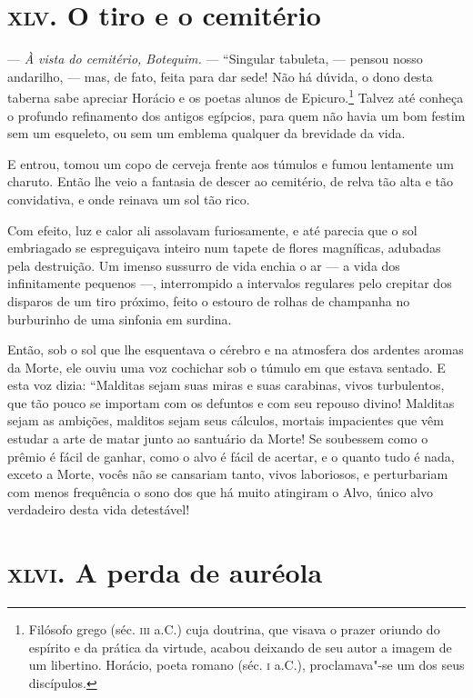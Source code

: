 \chapter{\textsc{xlv.} O tiro e o cemitério}

--- \textit{À vista do cemitério, Botequim.} --- “Singular tabuleta, ---
pensou nosso andarilho, --- mas, de fato, feita para dar sede! Não há dúvida, o dono desta taberna sabe apreciar Horácio e os poetas alunos
de Epicuro.\footnote{  Filósofo grego (séc. \textsc{iii} a.C.) cuja doutrina, que
visava o prazer oriundo do espírito e da prática da virtude, acabou
deixando de seu autor a imagem de um libertino. Horácio, poeta romano
(séc. \textsc{i} a.C.), proclamava"-se um dos seus discípulos.} Talvez até conheça o
profundo refinamento dos antigos egípcios, para quem não havia um bom festim sem um
esqueleto, ou sem um emblema qualquer da brevidade da
vida.

E entrou, tomou um copo de cerveja frente aos túmulos e fumou
lentamente um charuto. Então lhe veio a fantasia de descer ao
cemitério, de relva tão alta e tão convidativa, e onde reinava um
sol tão rico.

Com efeito, luz e calor ali assolavam furiosamente, e até parecia que o sol embriagado se espreguiçava inteiro num tapete de
flores magníficas, adubadas pela destruição. Um imenso sussurro de vida
enchia o ar --- a vida dos infinitamente pequenos ---, interrompido a
intervalos regulares pelo crepitar dos disparos de um tiro próximo, 
feito o estouro de rolhas de champanha no burburinho de uma
sinfonia em surdina.

Então, sob o sol que lhe esquentava o cérebro e na atmosfera dos
ardentes aromas da Morte, ele ouviu uma voz cochichar sob o túmulo em
que estava sentado. E esta voz dizia: ``Malditas sejam
suas miras e suas carabinas, vivos turbulentos, que tão
pouco se importam com os defuntos e com seu repouso divino! Malditas sejam as
ambições, malditos sejam seus cálculos, mortais impacientes que vêm
estudar a arte de matar junto ao santuário da Morte! Se soubessem
como o prêmio é fácil de ganhar, como o alvo é fácil de acertar, e o
quanto tudo é nada, exceto a Morte, vocês não se cansariam tanto, vivos
laboriosos, e perturbariam com menos frequência o sono dos que há
muito atingiram o Alvo, único alvo verdadeiro desta vida detestável!

\chapter{\textsc{xlvi.} A perda de auréola}

